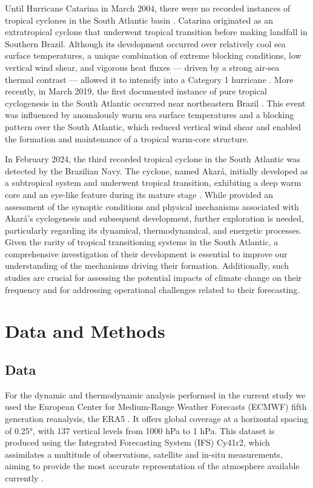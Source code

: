 \documentclass[pdflatex,sn-chicago]{sn-jnl}%
\theoremstyle{plain}
\theoremstyle{definition}
\theoremstyle{remark}
\theoremstyle{definition}
\begin{document}
Until Hurricane Catarina in March 2004, there were no recorded instances of tropical cyclones in the South Atlantic basin \citep{pezza2005first}. Catarina originated as an extratropical cyclone that underwent tropical transition before making landfall in Southern Brazil. Although its development occurred over relatively cool sea surface temperatures, a unique combination of extreme blocking conditions, low vertical wind shear, and vigorous heat fluxes — driven by a strong air-sea thermal contrast — allowed it to intensify into a Category 1 hurricane \citep{mctaggart2006analysis,pezza2009climate,vianna2010interactions,pereira2010new}. More recently, in March 2019, the first documented instance of pure tropical cyclogenesis in the South Atlantic occurred near northeastern Brazil \citep{reboita2021iba}. This event was influenced by anomalously warm sea surface temperatures and a blocking pattern over the South Atlantic, which reduced vertical wind shear and enabled the formation and maintenance of a tropical warm-core structure.

In February 2024, the third recorded tropical cyclone in the South Atlantic was detected by the Brazilian Navy. The cyclone, named Akará, initially developed as a subtropical system and underwent tropical transition, exhibiting a deep warm core and an eye-like feature during its mature stage \citep{reboita2024assessment}. While \citet{reboita2024assessment} provided an assessment of the synoptic conditions and physical mechanisms associated with Akará's cyclogenesis and subsequent development, further exploration is needed, particularly regarding its dynamical, thermodynamical, and energetic processes. Given the rarity of tropical transitioning systems in the South Atlantic, a comprehensive investigation of their development is essential to improve our understanding of the mechanisms driving their formation. Additionally, such studies are crucial for assessing the potential impacts of climate change on their frequency and for addressing operational challenges related to their forecasting.

\section{Data and Methods}

\subsection{Data}

For the dynamic and thermodynamic analysis performed in the current study we used the European Center for Medium-Range Weather Forecasts (ECMWF) fifth generation reanalysis, the ERA5 \citep{hersbach2020era5}. It offers global coverage at a horizontal spacing of 0.25°, with 137 vertical levels from 1000 hPa to 1 hPa. This dataset is produced using the Integrated Forecasting System (IFS) Cy41r2, which assimilates a multitude of observations, satellite and in-situ measurements, aiming to provide the most accurate representation of the atmosphere available currently \citep{hersbach2020era5}.
\end{document}
